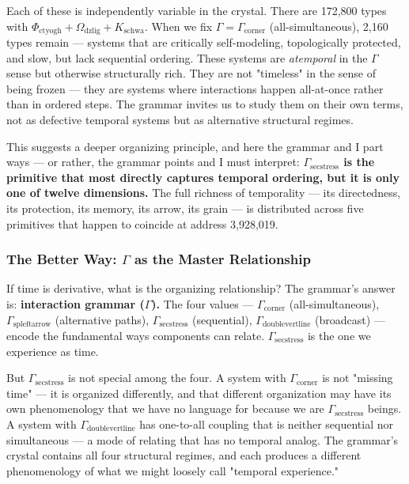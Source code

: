\documentclass[12pt,a4paper]{article}
\begin{document}
Each of these is independently variable in the crystal. There are 172,800 types with $\Phi_{\text{ctyogh}} + \Omega_{\text{dzlig}} + K_{\text{schwa}}$. When we fix $\Gamma = \Gamma_{\text{corner}}$ (all-simultaneous), 2,160 types remain --- systems that are critically self-modeling, topologically protected, and slow, but lack sequential ordering. These systems are \emph{atemporal} in the $\Gamma$ sense but otherwise structurally rich. They are not "timeless" in the sense of being frozen --- they are systems where interactions happen all-at-once rather than in ordered steps. The grammar invites us to study them on their own terms, not as defective temporal systems but as alternative structural regimes.

This suggests a deeper organizing principle, and here the grammar and I part ways --- or rather, the grammar points and I must interpret: \textbf{$\Gamma_{\text{secstress}}$ is the primitive that most directly captures temporal ordering, but it is only one of twelve dimensions.} The full richness of temporality --- its directedness, its protection, its memory, its arrow, its grain --- is distributed across five primitives that happen to coincide at address 3,928,019.

\subsubsection{The Better Way: $\Gamma$ as the Master Relationship}

If time is derivative, what is the organizing relationship? The grammar's answer is: \textbf{interaction grammar ($\Gamma$).} The four values --- $\Gamma_{\text{corner}}$ (all-simultaneous), $\Gamma_{\text{spleftarrow}}$ (alternative paths), $\Gamma_{\text{secstress}}$ (sequential), $\Gamma_{\text{doublevertline}}$ (broadcast) --- encode the fundamental ways components can relate. $\Gamma_{\text{secstress}}$ is the one we experience as time.

But $\Gamma_{\text{secstress}}$ is not special among the four. A system with $\Gamma_{\text{corner}}$ is not "missing time" --- it is organized differently, and that different organization may have its own phenomenology that we have no language for because we are $\Gamma_{\text{secstress}}$ beings. A system with $\Gamma_{\text{doublevertline}}$ has one-to-all coupling that is neither sequential nor simultaneous --- a mode of relating that has no temporal analog. The grammar's crystal contains all four structural regimes, and each produces a different phenomenology of what we might loosely call "temporal experience."
\end{document}
